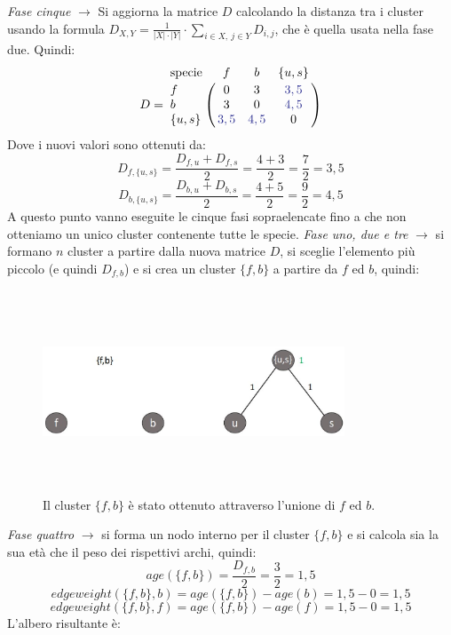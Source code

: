 \newline
\textit{Fase cinque} $\rightarrow$ Si aggiorna la matrice $D$ calcolando la distanza tra i cluster usando la formula $D_{X,Y}=\frac{1}{\left | X \right |\cdot \left | Y \right |} \cdot \sum_{i\in X,\: j\in Y}D_{i,j}$, che è quella usata nella fase due. Quindi:
\[
D = \bordermatrix{\text{specie}&f&b&\{u, s\}\cr
                f& 0 & 3 & {\color{Blue} 3,5}\cr
                b& 3 & 0 & {\color{Blue} 4,5}\cr
                \{u, s\}& {\color{Blue} 3,5} & {\color{Blue} 4,5} & 0}
\]
Dove i nuovi valori sono ottenuti da:
\[D_{f, \{u, s\}}=\frac{D_{f,u}+D_{f,s}}{2}=\frac{4+3}{2}=\frac{7}{2}=3,5\]
\[D_{b, \{u, s\}}=\frac{D_{b,u}+D_{b,s}}{2}=\frac{4+5}{2}=\frac{9}{2}=4,5\]
A questo punto vanno eseguite le cinque fasi sopraelencate fino a che non otteniamo un unico cluster contenente tutte le specie.
\newline
\textit{Fase uno, due e tre} $\rightarrow$  si formano $n$ cluster a partire dalla nuova matrice $D$, si sceglie l'elemento più piccolo (e quindi $D_{f, b}$) e si crea un cluster $\{f, b\}$ a partire da $f$ ed $b$, quindi:
\begin{figure}[h!]
\centering
	\includegraphics[height=6cm, width=9cm,keepaspectratio]{rooted_upgma_5.jpg}
 	\caption{Il cluster $\{f, b\}$ è stato ottenuto attraverso l'unione di $f$ ed $b$.}
  	\label{fig:rooted_upgma_5}
\end{figure}
\newline 
\textit{Fase quattro} $\rightarrow$ si forma un nodo interno per il cluster $\{f, b\}$ e si calcola sia la sua età che il peso dei rispettivi archi, quindi:
\[age(\{f, b\})=\frac{D_{f,b}}{2}=\frac{3}{2}=1,5\]
\[edgeweight(\{f, b\},b)=age(\{f, b\})-age(b)=1,5-0=1,5\]
\[edgeweight(\{f, b\},f)=age(\{f, b\})-age(f)=1,5-0=1,5\]
L'albero risultante è:
